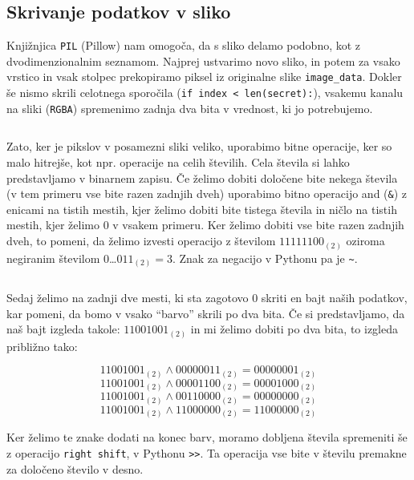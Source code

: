     \inputminted[firstline=21, lastline=23, frame=lines]{python}{latex/code_parts.py}


\subsection{Skrivanje podatkov v sliko}
    Knjižnjica \texttt{PIL} (Pillow) nam omogoča, da s sliko delamo podobno, kot z dvodimenzionalnim seznamom. Najprej ustvarimo novo sliko, in potem za vsako vrstico in vsak stolpec prekopiramo piksel iz originalne slike \texttt{image\_data}. Dokler še nismo skrili celotnega sporočila (\texttt{if index < len(secret):}), vsakemu kanalu na sliki (\texttt{RGBA}) spremenimo zadnja dva bita v vrednost, ki jo potrebujemo.

    \inputminted[firstline=25, lastline=49, frame=lines]{python}{latex/code_parts.py}

    Zato, ker je pikslov v posamezni sliki veliko, uporabimo bitne operacije, ker so malo hitrejše, kot npr. operacije na celih številih. Cela števila si lahko predstavljamo v binarnem zapisu. Če želimo dobiti določene bite nekega števila (v tem primeru vse bite razen zadnjih dveh) uporabimo bitno operacijo and (\texttt{\&}) z enicami na tistih mestih, kjer želimo dobiti bite tistega števila in ničlo na tistih mestih, kjer želimo $0$ v vsakem primeru. Ker želimo dobiti vse bite razen zadnjih dveh, to pomeni, da želimo izvesti operacijo z številom $11111100_{(2)}$ oziroma negiranim številom $0$\ldots$011_{(2)} = 3$. Znak za negacijo v Pythonu pa je \texttt{\~}.

    \inputminted[firstline=51, lastline=51, frame=lines]{python}{latex/code_parts.py}

    Sedaj želimo na zadnji dve mesti, ki sta zagotovo $0$ skriti en bajt naših podatkov, kar pomeni, da bomo v vsako ``barvo'' skrili po dva bita. Če si predstavljamo, da naš bajt izgleda takole: $11001001_{(2)}$ in mi želimo dobiti po dva bita, to izgleda približno tako:

    $$11001001_{(2)} \wedge 00000011_{(2)} = 00000001_{(2)}$$
    $$11001001_{(2)} \wedge 00001100_{(2)} = 00001000_{(2)}$$
    $$11001001_{(2)} \wedge 00110000_{(2)} = 00000000_{(2)}$$
    $$11001001_{(2)} \wedge 11000000_{(2)} = 11000000_{(2)}$$

    Ker želimo te znake dodati na konec barv, moramo dobljena števila spremeniti še z operacijo \texttt{right shift}, v Pythonu \texttt{>>}. Ta operacija vse bite v številu premakne za določeno število v desno.

